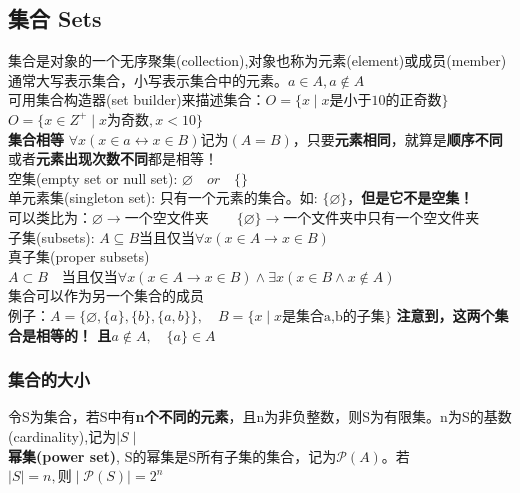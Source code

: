 \documentclass{article}
\begin{document}
    \subsection{集合 Sets}
    集合是对象的一个无序聚集(collection),对象也称为元素(element)或成员(member)\\
    通常大写表示集合，小写表示集合中的元素。\quad $a \in A, a \notin A$\\
    可用集合构造器(set builder)来描述集合：$O=\{x \mid x \text{是小于10的正奇数}\}$ \\
    $O = \{x\in Z^+ \mid x \text{为奇数},x<10\}$\\
    \textbf{集合相等} \quad $\forall x (x\in a \leftrightarrow x\in B) \text{记为} (A=B)$，只要\textbf{元素相同}，就算是\textbf{顺序不同}或者\textbf{元素出现次数不同}都是相等！
    \\
    空集(empty set or null set): $\varnothing \quad or \quad \{\}$ \\
    单元素集(singleton set): 只有一个元素的集合。如: $\{ \varnothing \}$，\textbf{但是它不是空集！}
    \\
    可以类比为：$\varnothing \rightarrow \text{一个空文件夹} \qquad \{\varnothing \} \rightarrow \text{一个文件夹中只有一个空文件夹}$
    \\
    子集(subsets): $A \subseteq B \text{当且仅当} \forall x(x\in A \rightarrow x\in B)$
    \\
    真子集(proper subsets) $A \subset B \quad \text{当且仅当} \forall x(x\in A \rightarrow x \in B) \wedge \exists x(x\in B \wedge x\notin A)$
    \\
    集合可以作为另一个集合的成员\\
    例子：$A=\{\varnothing, \{a\}, \{b\}, \{a,b\}\}, \quad B=\{x \mid x \text{是集合{a,b}的子集}\}$
    \textbf{注意到，这两个集合是相等的！ 且}$a\notin A, \quad \{a\} \in A$ \\
    \subsubsection{集合的大小}
    令S为集合，若S中有\textbf{n个不同的元素}，且n为非负整数，则S为有限集。n为S的基数(cardinality),记为$\mid S \mid$
    \\
    \textbf{幂集(power set)}, S的幂集是S所有子集的集合，记为$\mathcal{P}(A)$。若$\mid S \mid = n, 则\mid \mathcal{P}(S) \mid = 2^n$
    \\
\end{document}

